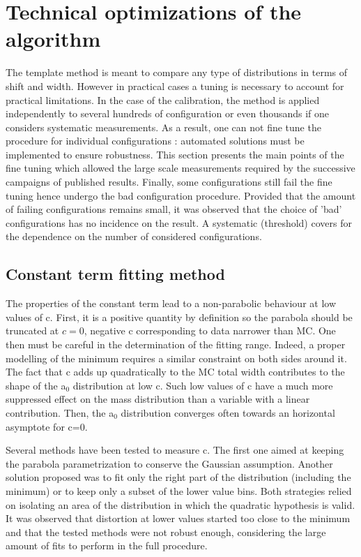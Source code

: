 \section{Technical optimizations of the algorithm}
\label{sec:org87e9766}

The template method  is meant to compare any type of distributions in terms of shift and width.
However in practical cases a tuning is necessary to account for practical limitations.
In the case of the calibration, the method is applied independently to several hundreds of configuration or even thousands if one considers systematic measurements.
As a result, one can not fine tune the procedure for individual configurations : automated solutions must be implemented to ensure robustness.
This section presents the main points of the fine tuning which allowed the large scale measurements required by the successive campaigns of published results.
Finally, some configurations still fail the fine tuning hence undergo the bad configuration procedure.
Provided that the amount of failing configurations remains small, it was observed that the choice of 'bad' configurations has no incidence on the result.
A systematic (threshold) covers for the dependence on the number of considered configurations.


\subsection{Constant term fitting method}
\label{sec:org2159561}
\label{sec:Calibration_inSitu_Tuning_fit}

The properties of the constant term lead to a non-parabolic behaviour at low values of c.
First, it is a positive quantity by definition so the parabola should be truncated at $c=0$, negative c corresponding to data narrower than MC.
One then must be careful in the determination of the fitting range.
Indeed, a proper modelling of the minimum requires a similar constraint on both sides around it.
The fact that c adds up quadratically to the MC total width contributes to the shape of the a\(_{\text{0}}\) distribution at low c.
Such low values of c have a much more suppressed effect on the mass distribution than a variable with a linear contribution.
Then, the a\(_{\text{0}}\) distribution converges often towards an horizontal asymptote for c=0.

Several methods have been tested to measure c.
The first one aimed at keeping the parabola parametrization to conserve the Gaussian assumption.
Another solution proposed was to fit only the right part of the distribution (including the minimum) or to keep only a subset of the lower value bins.
Both strategies relied on isolating an area of the distribution in which the quadratic hypothesis is valid.
It was observed that distortion at lower values started too close to the minimum and that the tested methods were not robust enough, considering the large amount of fits to perform in the full procedure.

